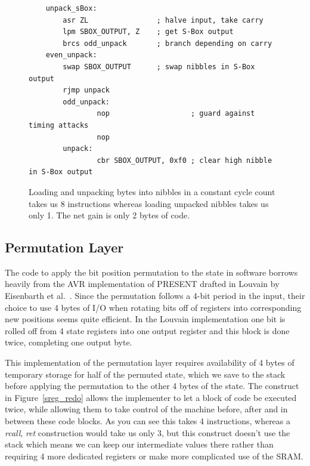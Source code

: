 \documentclass[11pt]{llncs2e} %
\begin{document}
\begin{figure}[H]
\centering
\begin{lstlisting}
	unpack_sBox:
		asr ZL                ; halve input, take carry
		lpm SBOX_OUTPUT, Z    ; get S-Box output
		brcs odd_unpack       ; branch depending on carry
	even_unpack:
		swap SBOX_OUTPUT      ; swap nibbles in S-Box output
		rjmp unpack
        odd_unpack:
                nop                   ; guard against timing attacks
                nop
        unpack:
                cbr SBOX_OUTPUT, 0xf0 ; clear high nibble in S-Box output
	\end{lstlisting}
	\caption{\footnotesize Loading and unpacking bytes into nibbles in a constant cycle count takes us 8 instructions whereas loading unpacked nibbles takes us only 1. The net gain is only 2 bytes of code.}
\label{unpacking_code}
\end{figure}


\subsection{Permutation Layer}
The code to apply the bit position permutation to the state in software borrows heavily from the AVR implementation of PRESENT drafted in Louvain by Eisenbarth et al.~\cite{eisenbarth2012compact}.
Since the permutation follows a 4-bit period in the input, their choice to use 4 bytes of I/O when rotating bits off of registers into corresponding new positions seems quite efficient.
In the Louvain implementation one bit is rolled off from 4 state registers into one output register and this block is done twice, completing one output byte.

This implementation of the permutation layer requires availability of 4 bytes of temporary storage for half of the permuted state, which we save to the stack before applying the permutation to the other 4 bytes of the state.
The construct in Figure~\ref{sreg_redo} allows the implementer to let a block of code be executed twice, while allowing them to take control of the machine before, after and in between these code blocks.
As you can see this takes 4 instructions, whereas a \textit{rcall}, \textit{ret} construction would take us only 3, but this construct doesn't use the stack which means we can keep our intermediate values there rather than requiring 4 more dedicated registers or make more complicated use of the SRAM.
\end{document}
